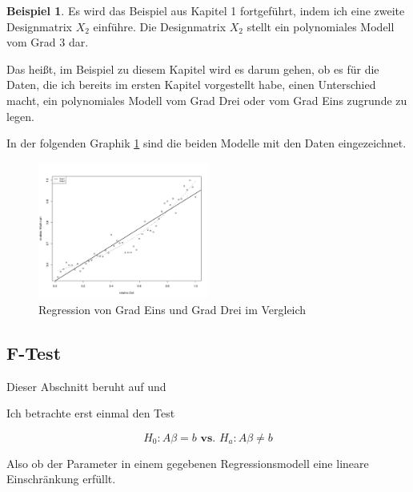 \documentclass[12pt,a4paper]{article}
\theoremstyle{definition}
\newtheorem{Beispiel}[Definition]{Beispiel}
\theoremstyle{definition}
\theoremstyle{definition}
\newcommand{\Ydat}{...}
\newcommand{\edat}{...}
\newcommand{\Xtwodat}[0]{...}
\newcommand{\Xonedat}[0]{...}
\newcommand{\betatwodat}[0]{\left[ \begin{array}{c} \beta_{0,2} \\ \beta_{1,2} \\ \beta_{1,3} \\ \beta_{1,4} \end{array} \right]}
\newcommand{\betaonedat}[0]{\left[ \begin{array}{c} \beta_{0,1} \\ \beta_{1,1} \end{array} \right]}
\begin{document}
\begin{Beispiel}
Es wird das Beispiel aus Kapitel 1 fortgeführt, indem ich eine zweite Designmatrix $X_2$ einführe. Die Designmatrix $X_2$ stellt ein polynomiales Modell vom Grad 3 dar. 

Das heißt, im Beispiel zu diesem Kapitel wird es darum gehen, ob es für die Daten, die ich bereits im ersten Kapitel vorgestellt habe, einen Unterschied macht, ein polynomiales Modell vom Grad Drei oder vom Grad Eins zugrunde zu legen. 

In der folgenden Graphik \ref{Vergleich-Bsp} sind die beiden Modelle mit den Daten eingezeichnet.

\begin{figure}[H] 
  \centering
     \includegraphics[width=0.5\textwidth]{Bsp-beide-in-einem-plot}
  \caption{Regression von Grad Eins und Grad Drei im Vergleich}
  \label{Vergleich-Bsp}
\end{figure}

%
\end{Beispiel}




\subsection{F-Test}
\label{Vergleich F-Test}
Dieser Abschnitt beruht auf \cite[114-115]{Liu64} und \cite{Draper98}

Ich betrachte erst einmal den Test

\begin{equation}
H_{0} : A\beta = b  \textbf{ vs. }  H_{a} : A\beta \neq b \label{Einschränkung_Hypothese}
\end{equation}

Also ob der Parameter in einem gegebenen Regressionsmodell eine lineare Einschränkung erfüllt.
\end{document}

